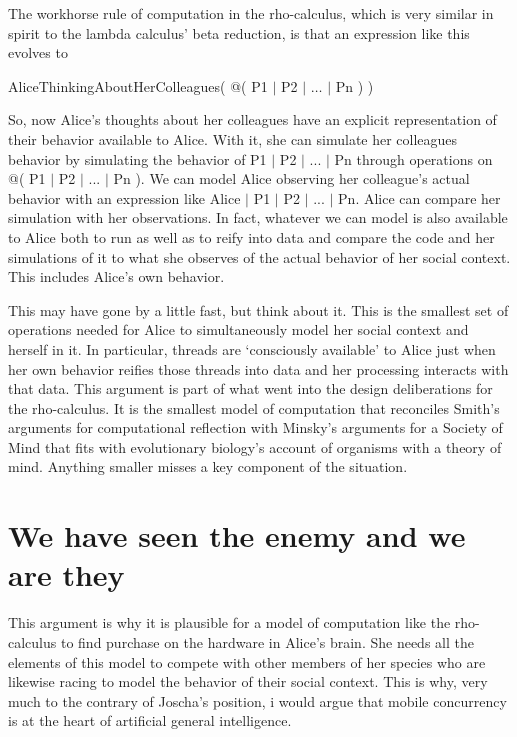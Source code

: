 \documentclass[runningheads]{llncs}
\begin{document}
\vspace{1\baselineskip}
The workhorse rule of computation in the rho-calculus, which is very similar in spirit to the lambda calculus’ beta reduction, is that an expression like this evolves to

\vspace{1\baselineskip}
AliceThinkingAboutHerColleagues( @( P1 $\vert$ P2 $\vert$ $\ldots$ $\vert$ Pn ) )

\vspace{1\baselineskip}
So, now Alice’s thoughts about her colleagues have an explicit representation of their behavior available to Alice. With it, she can simulate her colleagues behavior by simulating the behavior of P1 $\vert$ P2 $\vert$ ... $\vert$ Pn through operations on @( P1 $\vert$ P2 $\vert$ ... $\vert$ Pn ). We can model Alice observing her colleague’s actual behavior with an expression like Alice $\vert$ P1 $\vert$ P2 $\vert$ ... $\vert$ Pn. Alice can compare her simulation with her observations. In fact, whatever we can model is also available to Alice both to run as well as to reify into data and compare the code and her simulations of it to what she observes of the actual behavior of her social context. This includes Alice’s own behavior. 

\vspace{1\baselineskip}
This may have gone by a little fast, but think about it. This is the smallest set of operations needed for Alice to simultaneously model her social context and herself in it. In particular, threads are ‘consciously available’ to Alice just when her own behavior reifies those threads into data and her processing interacts with that data. This argument is part of what went into the design deliberations for the rho-calculus. It is the smallest model of computation that reconciles Smith’s arguments for computational reflection with Minsky’s arguments for a Society of Mind that fits with evolutionary biology’s account of organisms with a theory of mind. Anything smaller misses a key component of the situation.

\vspace{1\baselineskip}
\section{We have seen the enemy and we are they}

This argument is why it is plausible for a model of computation like the rho-calculus to find purchase on the hardware in Alice’s brain. She needs all the elements of this model to compete with other members of her species who are likewise racing to model the behavior of their social context. This is why, very much to the contrary of Joscha’s position, i would argue that mobile concurrency is at the heart of artificial general intelligence.

   

\end{document}
